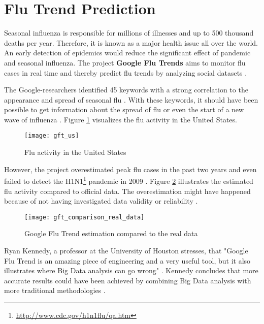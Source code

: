 \section{Flu Trend Prediction}
\label{sec:flu-trend-prediction}
Seasonal influenza is responsible for millions of illnesses and up to 500 thousand deaths per year. Therefore, it is known as a major health issue all over the world. An early detection of epidemics would reduce the significant effect of pandemic and seasonal influenza. The project \textbf{Google Flu Trends} aims to monitor flu cases in real time and thereby predict flu trends by analyzing social datasets \cites{Google09detection}[1]{Tech22014}.

The Google-researchers identified 45 keywords with a strong correlation to the appearance and spread of seasonal flu \cites{Weber2014}. With these keywords, it should have been possible to get information about the spread of flu or even the start of a new wave of influenza \cites{Weber2014}{Tech22014}{gft2014}. Figure \ref{fig:use_case_gft} visualizes the flu activity in the United States.

\begin{figure}[H]
  \centering
        \texttt{[image: gft\_us]}
  \caption[Flu activity in the United States]{Flu activity in the United States \cite{gft2014}}
  \label{fig:use_case_gft}
  \vspace{-1.3em}
\end{figure}

However, the project overestimated peak flu cases in the past two years and even failed to detect the H1N1\footnote{\url{http://www.cdc.gov/h1n1flu/qa.htm} \accessednote} pandemic in 2009 \cites{Tech22014}. Figure \ref{fig:use_case_gft_comparison} illustrates the estimated flu activity compared to official data. The overestimation might have happened because of not having investigated data validity or reliability \cites{Weber2014,Tech22014}. 

\begin{figure}[H]
  \centering
        \texttt{[image: gft\_comparison\_real\_data]}
  \caption[Google Flu Trend estimation compared to real data]{Google Flu Trend estimation compared to the real data\footnotemark \cite{gftcomparison2014}}
  \label{fig:use_case_gft_comparison}
\end{figure}

Ryan Kennedy, a professor at the University of Houston stresses, that "Google Flu Trend is an amazing piece of engineering and a very useful tool, but it also illustrates where Big Data analysis can go wrong" \cites{Tech22014}. Kennedy concludes that more accurate results could have been achieved by combining Big Data analysis with more traditional methodologies \cites{Tech22014}.